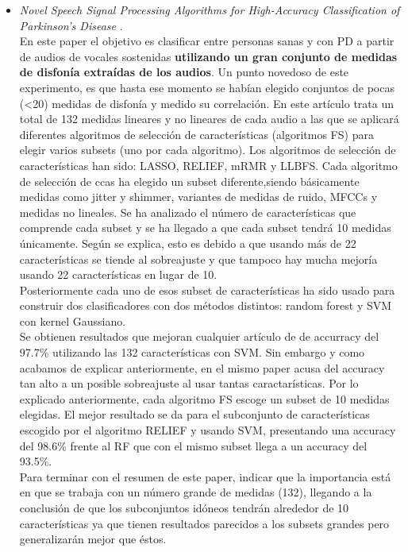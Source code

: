 \begin{itemize}
	\item \textit{Novel Speech Signal Processing Algorithms for High-Accuracy Classification of Parkinson's Disease} \cite{MxLtNovel}.\\
	En este paper el objetivo es clasificar entre personas sanas y con PD a partir de audios de vocales sostenidas \textbf{utilizando un gran conjunto de medidas de disfonía extraídas de los audios}. Un punto novedoso de este experimento, es que hasta ese momento se habían elegido conjuntos de pocas (<20) medidas de disfonía y medido su correlación. En este artículo trata un total de 132 medidas lineares y no lineares de cada audio a las que se aplicará diferentes algoritmos de selección de características (algoritmos FS) para elegir varios subsets (uno por cada algoritmo). Los algoritmos de selección de características han sido: LASSO, RELIEF, mRMR y LLBFS. Cada algoritmo de selección de ccas ha elegido un subset diferente,siendo básicamente medidas como jitter y shimmer, variantes de medidas de ruido, MFCCs y medidas no lineales. Se ha analizado el número de características que comprende cada subset y se ha llegado a que cada subset tendrá 10 medidas únicamente. Según se explica, esto es debido a que usando más de 22 características se tiende al sobreajuste y que tampoco hay mucha mejoría usando 22 características en lugar de 10.\\ Posteriormente cada uno de esos subset de características ha sido usado para construir dos clasificadores con dos métodos distintos: random forest y SVM con kernel Gaussiano.\\ Se obtienen resultados que mejoran cualquier artículo de de accurracy del 97.7\% utilizando las 132 características con SVM. Sin embargo y como acabamos de explicar anteriormente, en el mismo paper acusa del accuracy tan alto a un posible sobreajuste al usar tantas caractarísticas. Por lo explicado anteriormente, cada algoritmo FS escoge un subset de 10 medidas elegidas. El mejor resultado se da para el subconjunto de características escogido por el algoritmo RELIEF y usando SVM, presentando una accuracy del 98.6\% frente al RF que con el mismo subset llega a un accuracy del 93.5\%.\\Para terminar con el resumen de este paper, indicar que la importancia está en que se trabaja con un número grande de medidas (132), llegando a la conclusión de que los subconjuntos idóneos tendrán alrededor de 10 características ya que tienen resultados parecidos a los subsets grandes pero generalizarán mejor que éstos.
	
\end{itemize}

